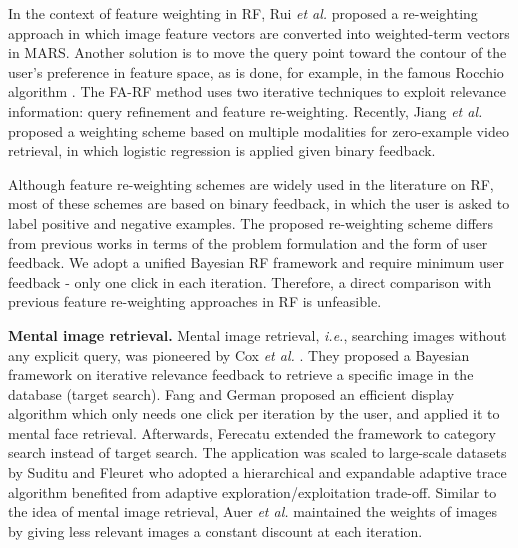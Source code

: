 \documentclass[journal]{IEEEtran}
\begin{document}
In the context of feature weighting in RF, Rui \textit{et al.} \cite{rui1997content} proposed a re-weighting approach in which image feature vectors are converted into weighted-term vectors in MARS.
Another solution is to move the query point toward the contour of the user's preference in feature space, as is done, for example, in the famous Rocchio algorithm \cite{rocchio1966document}. The FA-RF method \cite{grigorova2007content} uses two iterative techniques to exploit relevance information: query refinement and feature re-weighting.
Recently, Jiang \textit{et al.} \cite{jiang2014zero} proposed a weighting scheme based on multiple modalities for zero-example video retrieval, in which logistic regression is applied given binary feedback.

Although feature re-weighting schemes are widely used in the literature on RF, most of these schemes are based on binary feedback, in which the user is asked to label positive and negative examples.
The proposed re-weighting scheme differs from previous works in terms of the problem formulation and the form of user feedback. We adopt a unified Bayesian RF framework and require minimum user feedback - only one click in each iteration. Therefore, a direct comparison with previous feature re-weighting approaches in RF is unfeasible.

\textbf{Mental image retrieval.}
Mental image retrieval, \textit{i.e.}, searching images without any explicit query, was pioneered by Cox \textit{et al.} \cite{cox2000bayesian}. They proposed a Bayesian framework on iterative relevance feedback to retrieve a specific image in the database (target search). Fang and German \cite{fang2005experiments} proposed an efficient display algorithm which only needs one click per iteration by the user, and applied it to mental face retrieval. Afterwards, Ferecatu \cite{ferecatu2007interactive} extended the framework to category search instead of target search. The application was scaled to large-scale datasets by Suditu and Fleuret \cite{suditu2011heat,suditu2012iterative} who adopted a hierarchical and expandable adaptive trace algorithm benefited from adaptive exploration/exploitation trade-off.
Similar to the idea of mental image retrieval, Auer \textit{et al.} \cite{auer2011relevance} maintained the weights of images by giving less relevant images a constant discount at each iteration.
\end{document}
